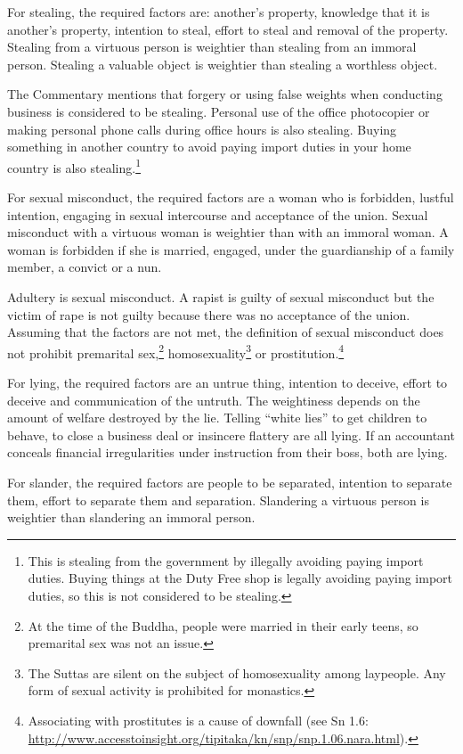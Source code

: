 For stealing, the required factors are: another’s property, knowledge that it is another’s property, intention to steal, effort to steal and removal of the property. Stealing from a virtuous person is weightier than stealing from an immoral person. Stealing a valuable object is weightier than stealing a worthless object.

The Commentary mentions that forgery or using false weights when conducting business is considered to be stealing. Personal use of the office photocopier or making personal phone calls during office hours is also stealing. Buying something in another country to avoid paying import duties in your home country is also stealing.\footnote{This is stealing from the government by illegally avoiding paying import duties. \color{red} Buying things at the Duty Free shop is legally avoiding paying import duties, so this is not considered to be stealing.\color{black}}

For sexual misconduct, the required factors are a woman who is forbidden, lustful intention, engaging in sexual intercourse and acceptance of the union. Sexual misconduct with a virtuous woman is weightier than with an immoral woman. A woman is forbidden if she is married, engaged, under the guardianship of a family member, a convict or a nun.

Adultery is sexual misconduct. A rapist is guilty of sexual misconduct but the victim of rape is not guilty because there was no acceptance of the union. Assuming that the factors are not met, the definition of sexual misconduct does not prohibit premarital sex,\footnote{At the time of the Buddha, people were married in their early teens, so premarital sex was not an issue.} homosexuality\footnote{The Suttas are silent on the subject of homosexuality among laypeople. Any form of sexual activity is prohibited for monastics.} or prostitution.\footnote{Associating with prostitutes is a cause of downfall (see Sn 1.6: \url{http://www.accesstoinsight.org/tipitaka/kn/snp/snp.1.06.nara.html}).}

For lying, the required factors are an untrue thing, intention to deceive, effort to deceive and communication of the untruth. The weightiness depends on the amount of welfare destroyed by the lie. Telling “white lies” to get children to behave, to close a business deal or insincere flattery are all lying. If an accountant conceals financial irregularities under instruction from their boss, both are lying.

For slander, the required factors are people to be separated, intention to separate them, effort to separate them and separation. Slandering a virtuous person is weightier than slandering an immoral person.


